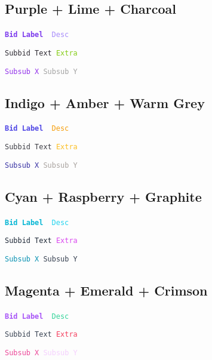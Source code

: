 \documentclass{article}
\begin{document}
\subsection*{Purple + Lime + Charcoal}
\noindent
\texttt{\bfseries {\textcolor[HTML]{7C3AED}{Bid Label}}}\ {\texttt{\textcolor[HTML]{A78BFA}{\small\ Desc}}}\par
\texttt{\small {\textcolor[HTML]{2D2A32}{Subbid Text}}\ {\textcolor[HTML]{84CC16}{Extra}}}\par
\texttt{\small {\textcolor[HTML]{9333EA}{Subsub X}}\ {\textcolor[HTML]{A3A3A3}{Subsub Y}}}\par

\subsection*{Indigo + Amber + Warm Grey}
\noindent
\texttt{\bfseries {\textcolor[HTML]{4F46E5}{Bid Label}}}\ {\texttt{\textcolor[HTML]{F59E0B}{\small\ Desc}}}\par
\texttt{\small {\textcolor[HTML]{3F3F46}{Subbid Text}}\ {\textcolor[HTML]{FBBF24}{Extra}}}\par
\texttt{\small {\textcolor[HTML]{3730A3}{Subsub X}}\ {\textcolor[HTML]{A8A29E}{Subsub Y}}}\par

\subsection*{Cyan + Raspberry + Graphite}
\noindent
\texttt{\bfseries {\textcolor[HTML]{06B6D4}{Bid Label}}}\ {\texttt{\textcolor[HTML]{22D3EE}{\small\ Desc}}}\par
\texttt{\small {\textcolor[HTML]{1F2937}{Subbid Text}}\ {\textcolor[HTML]{D946EF}{Extra}}}\par
\texttt{\small {\textcolor[HTML]{0891B2}{Subsub X}}\ {\textcolor[HTML]{374151}{Subsub Y}}}\par

\subsection*{Magenta + Emerald + Crimson}
\noindent
\texttt{\bfseries {\textcolor[HTML]{A855F7}{Bid Label}}}\ {\texttt{\textcolor[HTML]{34D399}{\small\ Desc}}}\par
\texttt{\small {\textcolor[HTML]{374151}{Subbid Text}}\ {\textcolor[HTML]{F43F5E}{Extra}}}\par
\texttt{\small {\textcolor[HTML]{EC4899}{Subsub X}}\ {\textcolor[HTML]{F5D0FE}{Subsub Y}}}\par
\end{document}
